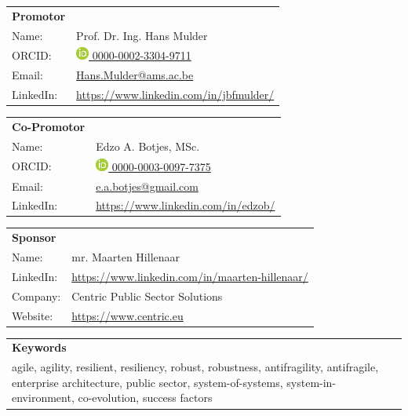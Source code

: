 	\begin{tabular}{p{}p{}}
		\textbf{Promotor} & \\
		Name: & Prof. Dr. Ing. Hans Mulder \\
		ORCID: & \href{https://orcid.org/0000-0002-3304-9711/}{\includegraphics[scale=0.45]{images/ORCIDiD_icon} 0000-0002-3304-9711}\\
		Email: & \href{mailto:hans.mulder@ams.ac.be}{Hans.Mulder@ams.ac.be}\\
		LinkedIn: & \url{https://www.linkedin.com/in/jbfmulder/}\\
	\end{tabular}

\vspace{\baselineskip}

	\begin{tabular}{p{}p{}}
		\textbf{Co-Promotor} & \\
		Name: & Edzo A. Botjes, MSc. \\
		ORCID: & \href{https://orcid.org/0000-0003-0097-7375/}{\includegraphics[scale=0.45]{images/ORCIDiD_icon} 0000-0003-0097-7375}\\
		Email: & \href{mailto:e.a.botjes@gmail.com}{e.a.botjes@gmail.com}\\
		LinkedIn: & \url{https://www.linkedin.com/in/edzob/}\\
	\end{tabular}

\vspace{\baselineskip}

	\begin{tabular}{p{}p{}}
		\textbf{Sponsor} & \\
		Name: & mr. Maarten Hillenaar \\
		LinkedIn:	&	\url{https://www.linkedin.com/in/maarten-hillenaar/}\\
		Company:	&	Centric Public Sector Solutions\\
		Website:	&	\url{https://www.centric.eu}
	\end{tabular}

\vspace{\baselineskip}

	\begin{tabular}{p{}}
		\textbf{Keywords} \\
		agile, agility, resilient, resiliency, robust, robustness, antifragility, antifragile, enterprise architecture, public sector, system-of-systems, system-in-environment, co-evolution, success factors\\%
	\end{tabular}
